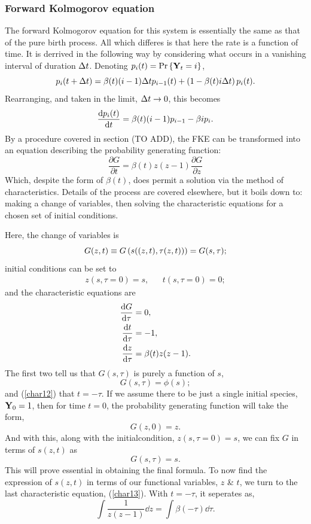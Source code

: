 \subsubsection*{Forward Kolmogorov equation}

The forward Kolmogorov equation for this system is essentially the same as that of the pure birth process. All which differes is that here the rate is a function of time. It is derrived in the following way by considering what occurs in a vanishing interval of duration $\Delta t$. Denoting $p_i(t) = {\text{Pr}\left\{{{\bf Y}_t} = i\right\}}$,
$$p_i(t+\Delta t) = \beta(t)(i-1) \Delta t p_{i-1}(t) + \left(1 - \beta(t) i \Delta t\right) p_i(t).$$
Rearranging, and taken in the limit, $\Delta t\to 0$, this becomes
$$\displaystyle\frac{{\rm d} p_i(t)}{{\rm d} t} = \beta(t)(i-1) p_{i-1} - \beta i p_i.$$
By a procedure covered in section (TO ADD), the FKE can be transformed into an equation describing the probability generating function: 
$$\frac{\partial G}{\partial t} = \beta(t) z(z - 1) \frac{\partial G}{\partial z}$$  
Which, despite the form of $\beta(t)$, does permit a solution via the method of characteristics. Details of the process are covered elsewhere, but it boils down to: making a change of variables, then solving the characteristic equations for a chosen set of initial conditions. \par
Here, the change of variables is 
$$G(z,t) \equiv G\left( s((z,t), \tau(z,t))\right) = G(s,\tau);$$
initial conditions can be set to
\begin{align}
\label{charICs}
z(s, \tau = 0) = s, && t(s, \tau = 0) = 0;
\end{align}
and the characteristic equations are
\begin{align}
\displaystyle\frac{{\rm d} G}{{\rm d} \tau} &= 0,\\
\displaystyle\frac{{\rm d} t}{{\rm d} \tau} &= -1,\label{char12}\\
\displaystyle\frac{{\rm d} z}{{\rm d} \tau} &= \beta(t)z(z - 1).\label{char13}
\end{align}
The first two tell us that $G(s,\tau)$ is purely a function of $s$,
$$G(s,\tau) = \phi(s);$$
and (\ref{char12}) that $t = -\tau$. If we assume there to be just a single initial species, ${\bf Y}_0 = 1$, then for time $t=0$, the probability generating function will take the form,
$$G(z, 0) = z.$$
And with this, along with the initialcondition, $z(s, \tau = 0) = s$, we can fix $G$ in terms of $s(z,t)$ as 
$$G(s, \tau) = s.$$
This will prove essential in obtaining the final formula. To now find the expression of $s(z,t)$ in terms of our functional variables, $z$ \& $t$, we turn to the last characteristic equation, (\ref{char13}). With $t = -\tau$, it seperates as,
\begin{equation}
\label{char3int}
\int\frac{1}{z(z-1)}\dd z = \int \beta(-\tau) \dd\tau.
\end{equation}
